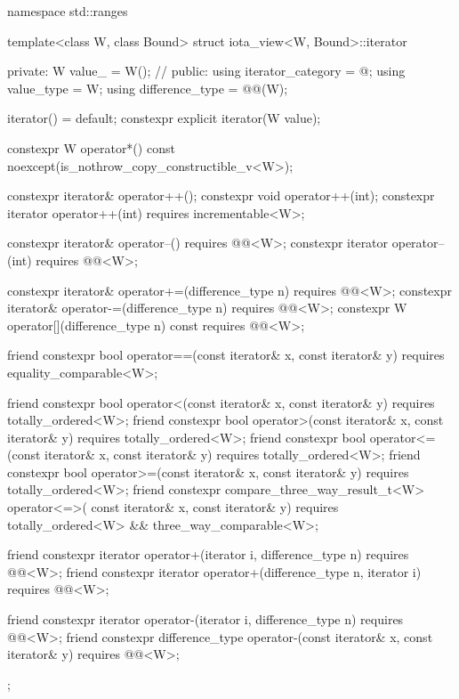 %
\begin{codeblock}
namespace std::ranges {
  template<class W, class Bound>
  struct iota_view<W, Bound>::iterator {
  private:
    W value_ = W();             // \expos
  public:
    using iterator_category = @\seebelow@;
    using value_type = W;
    using difference_type = @@(W);

    iterator() = default;
    constexpr explicit iterator(W value);

    constexpr W operator*() const noexcept(is_nothrow_copy_constructible_v<W>);

    constexpr iterator& operator++();
    constexpr void operator++(int);
    constexpr iterator operator++(int) requires incrementable<W>;

    constexpr iterator& operator--() requires @@<W>;
    constexpr iterator operator--(int) requires @@<W>;

    constexpr iterator& operator+=(difference_type n)
      requires @@<W>;
    constexpr iterator& operator-=(difference_type n)
      requires @@<W>;
    constexpr W operator[](difference_type n) const
      requires @@<W>;

    friend constexpr bool operator==(const iterator& x, const iterator& y)
      requires equality_comparable<W>;

    friend constexpr bool operator<(const iterator& x, const iterator& y)
      requires totally_ordered<W>;
    friend constexpr bool operator>(const iterator& x, const iterator& y)
      requires totally_ordered<W>;
    friend constexpr bool operator<=(const iterator& x, const iterator& y)
      requires totally_ordered<W>;
    friend constexpr bool operator>=(const iterator& x, const iterator& y)
      requires totally_ordered<W>;
    friend constexpr compare_three_way_result_t<W> operator<=>(
        const iterator& x, const iterator& y)
      requires totally_ordered<W> && three_way_comparable<W>;

    friend constexpr iterator operator+(iterator i, difference_type n)
      requires @@<W>;
    friend constexpr iterator operator+(difference_type n, iterator i)
      requires @@<W>;

    friend constexpr iterator operator-(iterator i, difference_type n)
      requires @@<W>;
    friend constexpr difference_type operator-(const iterator& x, const iterator& y)
      requires @@<W>;
  };
}
\end{codeblock}

